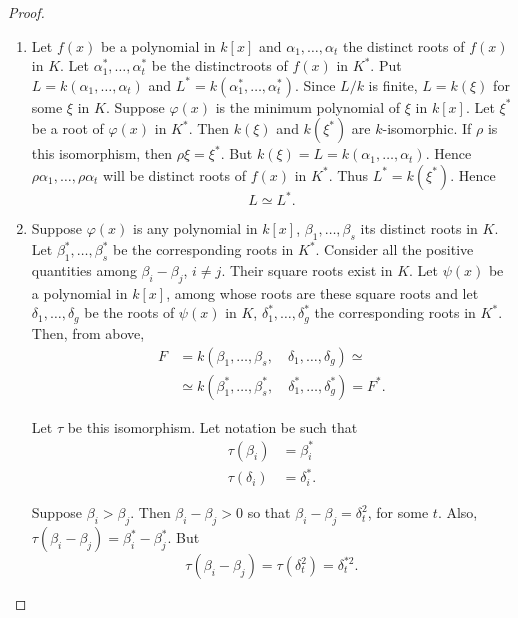 \begin{proof}
\begin{enumerate}[1)]
\item Let $f(x)$ be a polynomial in $k[x]$ and $\alpha_1, \ldots,
  \alpha_t$ the distinct roots of $f(x)$ in $K$. Let $\alpha^{\ast}_1,
  \ldots, \alpha^{\ast}_t$ be the distinct\pageoriginale roots of $f(x)$ in
  $K^{\ast}$. Put $L = k (\alpha_1, \ldots, \alpha_t)$ and $L^{\ast} =
  k (\alpha^{\ast}_1, \ldots, \alpha^{\ast}_t)$. Since $L/k$ is
  finite, $L=k(\xi)$ for some $\xi$ in $K$. Suppose $\varphi(x)$ is
  the minimum polynomial of $\xi$ in $k[x]$. Let $\xi^{\ast}$ be a
  root of $\varphi(x)$ in $K^{\ast}$. Then $k(\xi)$ and
  $k(\xi^{\ast})$ are $k$-isomorphic. If $\rho$ is this isomorphism,
  then $\rho \xi = \xi^{\ast}$. But $k(\xi) = L = k( \alpha_1, \ldots,
  \alpha_t)$. Hence $\rho \alpha_1, \ldots, \rho \alpha_t$ will be
  distinct roots of $f(x)$ in $K^{\ast}$. Thus $L^{\ast} = k
  (\xi^{\ast})$. Hence
$$
L \simeq L^{\ast}.
$$

\item Suppose $\varphi(x)$ is any polynomial in $k[x]$, $\beta_1,
  \ldots, \beta_s$ its distinct roots in $K$. Let $\beta^{\ast}_1,
  \ldots, \beta^{\ast}_s$ be the corresponding roots in
  $K^{\ast}$. Consider all the positive quantities among $\beta_i -
  \beta_j$, $i \neq j$. Their square roots exist in $K$. Let $\psi(x)$
  be a polynomial in $k[x]$, among whose roots are these square roots
  and let $\delta_1,\ldots, \delta_g$ be the roots of $\psi(x)$ in
  $K$, $\delta^{\ast}_1, \ldots, \delta^{\ast}_g$ the corresponding
  roots in $K^{\ast}$. Then, from above,
\begin{align*}
 F & = k (\beta_1, \ldots, \beta_s, \quad \delta_1, \ldots, \delta_g)
\simeq\\
& \simeq k (\beta^{\ast}_1, \ldots, \beta^{\ast}_s, \quad
\delta^{\ast}_1, \ldots, \delta^{\ast}_g) = F^{\ast}.
\end{align*}

Let $\tau$ be this isomorphism. Let notation be such that 
\begin{align*}
\tau(\beta_i) & = \beta^{\ast}_i\\
\tau(\delta_i) & = \delta^{\ast}_i.
\end{align*}

Suppose $\beta_i > \beta_j$. Then $\beta_i - \beta_j >0$ so that
$\beta_i - \beta_j = \delta^2_t$, for some $t$. Also, $\tau(\beta_i -
\beta_j) =\beta^{\ast}_i - \beta^{\ast}_j$. But
$$
\tau(\beta_i - \beta_j) = \tau (\delta^2_t) = \delta^{\ast 2}_t.
$$ 


\end{enumerate}
\end{proof}
